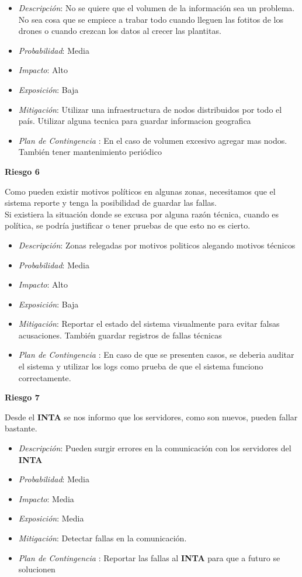 \begin{itemize}
 \item \textsl{Descripci\'on}: No se quiere que el volumen de la informaci\'on sea un problema. No sea cosa que se empiece a trabar todo cuando lleguen las fotitos de los drones o cuando crezcan los datos al crecer las plantitas.
 \item \textsl{Probabilidad}: Media
 \item \textsl{Impacto}: Alto	
 \item \textsl{Exposición}: Baja
 \item \textsl{Mitigación}: Utilizar una infraestructura de nodos distribuidos por todo el país. Utilizar alguna tecnica para guardar informacion geografica
 \item \textsl{Plan de Contingencia} : En el caso de volumen excesivo agregar mas nodos. Tambi\'en tener mantenimiento peri\'odico
\end{itemize}

\textbf{Riesgo 6}

Como pueden existir motivos pol\'iticos en algunas zonas, necesitamos que el sistema reporte y tenga la posibilidad de guardar las fallas. \\
Si existiera la situaci\'on donde se excusa por alguna raz\'on t\'ecnica, cuando es pol\'itica, se podr\'ia justificar o tener pruebas de que esto no es cierto.

\begin{itemize}
 \item \textsl{Descripci\'on}: Zonas relegadas por motivos politicos alegando motivos t\'ecnicos
 \item \textsl{Probabilidad}: Media
 \item \textsl{Impacto}: Alto
 \item \textsl{Exposición}: Baja
 \item \textsl{Mitigación}: Reportar el estado del sistema visualmente para evitar falsas acusaciones. Tambi\'en guardar registros de fallas t\'ecnicas
 \item \textsl{Plan de Contingencia} : En caso de que se presenten casos, se deberia auditar el sistema y utilizar los logs como prueba de que el sistema funciono correctamente. 
\end{itemize}

\textbf{Riesgo 7}

Desde el \textbf{INTA} se nos informo que los servidores, como son nuevos, pueden fallar bastante.

\begin{itemize}
 \item \textsl{Descripci\'on}: Pueden surgir errores en la comunicaci\'on con los servidores del \textbf{INTA}
 \item \textsl{Probabilidad}: Media
 \item \textsl{Impacto}: Media
 \item \textsl{Exposición}: Media
 \item \textsl{Mitigación}: Detectar fallas en la comunicación.
 \item \textsl{Plan de Contingencia} : Reportar las fallas al \textbf{INTA} para que a futuro se solucionen
\end{itemize}


